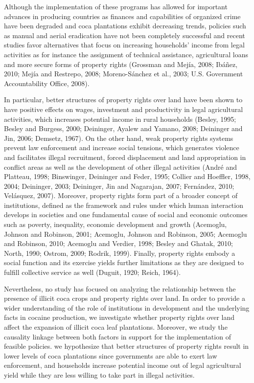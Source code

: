 \documentclass[12pt,a4paper,english]{article}%
\begin{document}
Although the implementation of these programs has allowed for important advances in producing countries as finances and capabilities of organized crime have been degraded and coca plantations exhibit decreasing trends, policies such as manual and aerial eradication have not been completely successful and recent studies favor alternatives that focus on increasing households' income from legal activities as for instance the assignment of technical assistance, agricultural loans and more secure forms of property rights (Grossman and Mej\'{i}a, 2008; Ib\'{a}\~{n}ez, 2010; Mej\'{i}a and Restrepo, 2008; Moreno-S\'{a}nchez et al., 2003; U.S. Government Accountability Office, 2008).  

In particular, better structures of property rights over land have been shown to have positive effects on wages, investment and productivity in legal agricultural activities, which increases potential income in rural households (Besley, 1995; Besley and Burgess, 2000; Deininger, Ayalew and Yamano, 2008; Deininger and Jin, 2006; Demsetz, 1967). On the other hand, weak property rights systems prevent law enforcement and increase social tensions, which generates violence and facilitates illegal recruitment, forced displacement and land appropriation in conflict areas as well as the development of other illegal activities (Andr\'{e} and Platteau, 1998; Binswinger, Deininger and Feder, 1995; Collier and Hoeffler, 1998, 2004; Deininger, 2003; Deininger, Jin and Nagarajan, 2007; Fern\'{a}ndez, 2010; Vel\'{a}squez, 2007). Moreover, property rights form part of a broader concept of institutions, defined as the framework and rules under which human interaction develops in societies and one fundamental cause of social and economic outcomes such as poverty, inequality, economic development and growth (Acemoglu, Johnson and Robinson, 2001; Acemoglu, Johnson and Robinson, 2005; Acemoglu and Robinson, 2010; Acemoglu and Verdier, 1998; Besley and Ghatak, 2010; North, 1990; Ostrom, 2009; Rodrik, 1999). Finally, property rights embody a social function and its exercise yields further limitations as they are designed to fulfill collective service as well (Duguit, 1920; Reich, 1964).

Nevertheless, no study has focused on analyzing the relationship between the presence of illicit coca crops and property rights over land. In order to provide a wider understanding of the role of institutions in development and the underlying facts in cocaine production, we investigate whether property rights over land affect the expansion of illicit coca leaf plantations. Moreover, we study the causality linkage between both factors in support for the implementation of feasible policies. we hypothesize that better structures of property rights result in lower levels of coca plantations since governments are able to exert law enforcement, and households increase potential income out of legal agricultural yield while they are less willing to take part in illegal activities.
\end{document}
